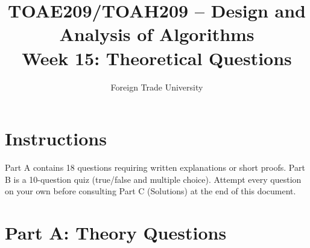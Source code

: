 \documentclass[11pt]{article}
\title{TOAE209/TOAH209 -- Design and Analysis of Algorithms\\[4pt]
\large Week 15: Theoretical Questions}
\author{Foreign Trade University}
\date{}
\begin{document}
\maketitle

\section*{Instructions}

Part A contains 18 questions requiring written explanations or short proofs. Part B is a
10-question quiz (true/false and multiple choice). Attempt every question on your own
before consulting Part C (Solutions) at the end of this document.

\section*{Part A: Theory Questions}
\end{document}
